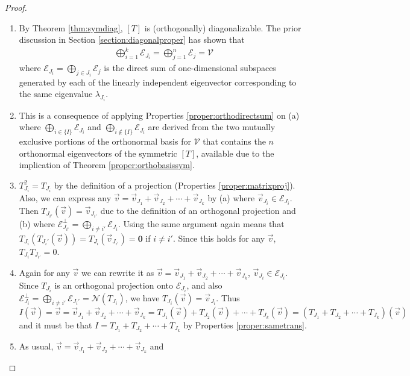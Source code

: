 \begin{proof}
\begin{enumerate}[label=(\alph*)]  
\item By Theorem \ref{thm:symdiag}, $[T]$ is (orthogonally) diagonalizable. The prior discussion in Section \ref{section:diagonalproper} has shown that
\begin{align*}
\bigoplus_{i=1}^{k} \mathcal{E}_{J_i} = \bigoplus_{j=1}^n \mathcal{E}_j = \mathcal{V} 
\end{align*}
where $\mathcal{E}_{J_i} = \bigoplus_{j \in J_i} \mathcal{E}_j$ is the direct sum of one-dimensional subspaces generated by each of the linearly independent eigenvector corresponding to the same eigenvalue $\lambda_{J_i}$.
\item This is a consequence of applying Properties \ref{proper:orthodirectsum} on (a) where $\bigoplus_{i \in \{I\}} \mathcal{E}_{J_i}$ and $\bigoplus_{i \notin \{I\}} \mathcal{E}_{J_i}$ are derived from the two mutually exclusive portions of the orthonormal basis for $\mathcal{V}$ that contains the $n$ orthonormal eigenvectors of the symmetric $[T]$, available due to the implication of Theorem \ref{proper:orthobasissym}.
\item $T_{J_i}^2 = T_{J_i}$ by the definition of a projection (Properties \ref{proper:matrixproj}). Also, we can express any $\vec{v} = \vec{v}_{J_1} + \vec{v}_{J_2} + \cdots + \vec{v}_{J_k}$ by (a) where $\vec{v}_{J_i} \in \mathcal{E}_{J_i}$. Then $T_{J_{i'}}(\vec{v}) = \vec{v}_{J_{i'}}$ due to the definition of an orthogonal projection and (b) where $\mathcal{E}_{J_{i'}}^\perp = \bigoplus_{i \neq i'} \mathcal{E}_{J_i}$. Using the same argument again means that $T_{J_i}(T_{J_i'}(\vec{v})) = T_{J_i}(\vec{v}_{J_{i'}}) = \textbf{0}$ if $i \neq i'$. Since this holds for any $\vec{v}$, $T_{J_i} T_{J_{i'}} = 0$.
\item Again for any $\vec{v}$ we can rewrite it as $\vec{v} = \vec{v}_{J_1} + \vec{v}_{J_2} + \cdots + \vec{v}_{J_k}$, $\vec{v}_{J_i} \in \mathcal{E}_{J_i}$. Since $T_{J_i}$ is an orthogonal projection onto $\mathcal{E}_{J_i}$, and also $\mathcal{E}_{J_{i}}^\perp = \bigoplus_{i \neq i'} \mathcal{E}_{J_i'} = \mathcal{N}(T_{J_i})$, we have $T_{J_i}(\vec{v}) = \vec{v}_{J_i}$. Thus $I(\vec{v}) = \vec{v} = \vec{v}_{J_1} + \vec{v}_{J_2} + \cdots + \vec{v}_{J_k} = T_{J_1}(\vec{v}) + T_{J_2}(\vec{v}) + \cdots + T_{J_k}(\vec{v}) = (T_{J_1} + T_{J_2} + \cdots + T_{J_k})(\vec{v})$ and it must be that $I = T_{J_1} + T_{J_2} + \cdots + T_{J_k}$ by Properties \ref{proper:sametrans}.
\item As usual, $\vec{v} = \vec{v}_{J_1} + \vec{v}_{J_2} + \cdots + \vec{v}_{J_k}$ and

\end{enumerate}
\end{proof}
